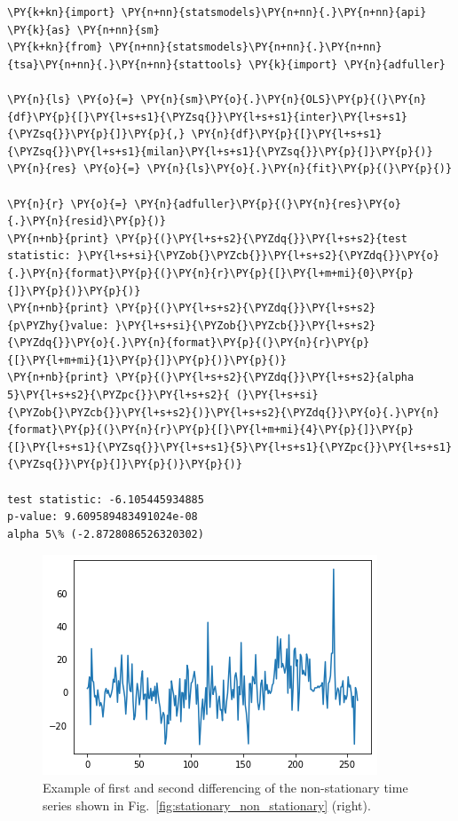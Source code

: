\begin{tcolorbox}[breakable, size=fbox, boxrule=1pt, pad at break*=1mm,colback=cellbackground, colframe=cellborder]
\begin{Verbatim}[commandchars=\\\{\}]
\PY{k+kn}{import} \PY{n+nn}{statsmodels}\PY{n+nn}{.}\PY{n+nn}{api} \PY{k}{as} \PY{n+nn}{sm}
\PY{k+kn}{from} \PY{n+nn}{statsmodels}\PY{n+nn}{.}\PY{n+nn}{tsa}\PY{n+nn}{.}\PY{n+nn}{stattools} \PY{k}{import} \PY{n}{adfuller}

\PY{n}{ls} \PY{o}{=} \PY{n}{sm}\PY{o}{.}\PY{n}{OLS}\PY{p}{(}\PY{n}{df}\PY{p}{[}\PY{l+s+s1}{\PYZsq{}}\PY{l+s+s1}{inter}\PY{l+s+s1}{\PYZsq{}}\PY{p}{]}\PY{p}{,} \PY{n}{df}\PY{p}{[}\PY{l+s+s1}{\PYZsq{}}\PY{l+s+s1}{milan}\PY{l+s+s1}{\PYZsq{}}\PY{p}{]}\PY{p}{)}
\PY{n}{res} \PY{o}{=} \PY{n}{ls}\PY{o}{.}\PY{n}{fit}\PY{p}{(}\PY{p}{)}

\PY{n}{r} \PY{o}{=} \PY{n}{adfuller}\PY{p}{(}\PY{n}{res}\PY{o}{.}\PY{n}{resid}\PY{p}{)}
\PY{n+nb}{print} \PY{p}{(}\PY{l+s+s2}{\PYZdq{}}\PY{l+s+s2}{test statistic: }\PY{l+s+si}{\PYZob{}\PYZcb{}}\PY{l+s+s2}{\PYZdq{}}\PY{o}{.}\PY{n}{format}\PY{p}{(}\PY{n}{r}\PY{p}{[}\PY{l+m+mi}{0}\PY{p}{]}\PY{p}{)}\PY{p}{)}
\PY{n+nb}{print} \PY{p}{(}\PY{l+s+s2}{\PYZdq{}}\PY{l+s+s2}{p\PYZhy{}value: }\PY{l+s+si}{\PYZob{}\PYZcb{}}\PY{l+s+s2}{\PYZdq{}}\PY{o}{.}\PY{n}{format}\PY{p}{(}\PY{n}{r}\PY{p}{[}\PY{l+m+mi}{1}\PY{p}{]}\PY{p}{)}\PY{p}{)}
\PY{n+nb}{print} \PY{p}{(}\PY{l+s+s2}{\PYZdq{}}\PY{l+s+s2}{alpha 5}\PY{l+s+s2}{\PYZpc{}}\PY{l+s+s2}{ (}\PY{l+s+si}{\PYZob{}\PYZcb{}}\PY{l+s+s2}{)}\PY{l+s+s2}{\PYZdq{}}\PY{o}{.}\PY{n}{format}\PY{p}{(}\PY{n}{r}\PY{p}{[}\PY{l+m+mi}{4}\PY{p}{]}\PY{p}{[}\PY{l+s+s1}{\PYZsq{}}\PY{l+s+s1}{5}\PY{l+s+s1}{\PYZpc{}}\PY{l+s+s1}{\PYZsq{}}\PY{p}{]}\PY{p}{)}\PY{p}{)}

test statistic: -6.105445934885
p-value: 9.609589483491024e-08
alpha 5\% (-2.8728086526320302)
\end{Verbatim}
\end{tcolorbox}

\begin{figure}[htb]
	\centering
	\includegraphics[width=0.7\linewidth]{figures/residual_plot.png}
	\caption{Example of first and second differencing of the non-stationary time series shown in Fig.~\ref{fig:stationary_non_stationary} (right).}
	\label{fig:residual}
\end{figure}
    
